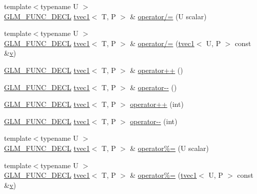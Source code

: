 \begin{DoxyCompactItemize}
\item 
{\footnotesize template$<$typename U $>$ }\\\mbox{\hyperlink{setup_8hpp_ab2d052de21a70539923e9bcbf6e83a51}{G\+L\+M\+\_\+\+F\+U\+N\+C\+\_\+\+D\+E\+CL}} \mbox{\hyperlink{structglm_1_1tvec1}{tvec1}}$<$ T, P $>$ \& \mbox{\hyperlink{structglm_1_1tvec1_a1790540d3ffa2385ba06a24cb02666f0}{operator/=}} (U scalar)
\item 
{\footnotesize template$<$typename U $>$ }\\\mbox{\hyperlink{setup_8hpp_ab2d052de21a70539923e9bcbf6e83a51}{G\+L\+M\+\_\+\+F\+U\+N\+C\+\_\+\+D\+E\+CL}} \mbox{\hyperlink{structglm_1_1tvec1}{tvec1}}$<$ T, P $>$ \& \mbox{\hyperlink{structglm_1_1tvec1_a09ef15d7a57cbcf441eb01d3fc832b5d}{operator/=}} (\mbox{\hyperlink{structglm_1_1tvec1}{tvec1}}$<$ U, P $>$ const \&\mbox{\hyperlink{glad_8h_a14cfbe2fc2234f5504618905b69d1e06}{v}})
\item 
\mbox{\hyperlink{setup_8hpp_ab2d052de21a70539923e9bcbf6e83a51}{G\+L\+M\+\_\+\+F\+U\+N\+C\+\_\+\+D\+E\+CL}} \mbox{\hyperlink{structglm_1_1tvec1}{tvec1}}$<$ T, P $>$ \& \mbox{\hyperlink{structglm_1_1tvec1_a073c75830716722cd4ffcb516788cec5}{operator++}} ()
\item 
\mbox{\hyperlink{setup_8hpp_ab2d052de21a70539923e9bcbf6e83a51}{G\+L\+M\+\_\+\+F\+U\+N\+C\+\_\+\+D\+E\+CL}} \mbox{\hyperlink{structglm_1_1tvec1}{tvec1}}$<$ T, P $>$ \& \mbox{\hyperlink{structglm_1_1tvec1_ae2afe02d40b7a469d33543f16307611a}{operator-\/-\/}} ()
\item 
\mbox{\hyperlink{setup_8hpp_ab2d052de21a70539923e9bcbf6e83a51}{G\+L\+M\+\_\+\+F\+U\+N\+C\+\_\+\+D\+E\+CL}} \mbox{\hyperlink{structglm_1_1tvec1}{tvec1}}$<$ T, P $>$ \mbox{\hyperlink{structglm_1_1tvec1_a4dbefeaefe398e52093be02b638047cd}{operator++}} (int)
\item 
\mbox{\hyperlink{setup_8hpp_ab2d052de21a70539923e9bcbf6e83a51}{G\+L\+M\+\_\+\+F\+U\+N\+C\+\_\+\+D\+E\+CL}} \mbox{\hyperlink{structglm_1_1tvec1}{tvec1}}$<$ T, P $>$ \mbox{\hyperlink{structglm_1_1tvec1_af4251163c1a4e5a83e2c09e4dd685ecd}{operator-\/-\/}} (int)
\item 
{\footnotesize template$<$typename U $>$ }\\\mbox{\hyperlink{setup_8hpp_ab2d052de21a70539923e9bcbf6e83a51}{G\+L\+M\+\_\+\+F\+U\+N\+C\+\_\+\+D\+E\+CL}} \mbox{\hyperlink{structglm_1_1tvec1}{tvec1}}$<$ T, P $>$ \& \mbox{\hyperlink{structglm_1_1tvec1_a9b4ef4d29f77f31ce24043f0dbb185f4}{operator\%=}} (U scalar)
\item 
{\footnotesize template$<$typename U $>$ }\\\mbox{\hyperlink{setup_8hpp_ab2d052de21a70539923e9bcbf6e83a51}{G\+L\+M\+\_\+\+F\+U\+N\+C\+\_\+\+D\+E\+CL}} \mbox{\hyperlink{structglm_1_1tvec1}{tvec1}}$<$ T, P $>$ \& \mbox{\hyperlink{structglm_1_1tvec1_acb4b8e73890ac7f9a0b4700c1c268500}{operator\%=}} (\mbox{\hyperlink{structglm_1_1tvec1}{tvec1}}$<$ U, P $>$ const \&\mbox{\hyperlink{glad_8h_a14cfbe2fc2234f5504618905b69d1e06}{v}})

\end{DoxyCompactItemize}
